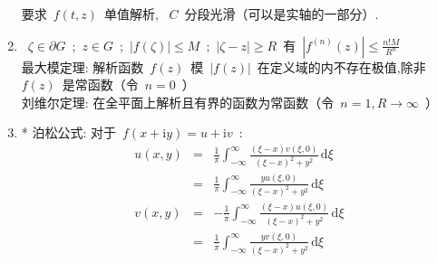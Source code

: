 \documentclass[11pt,a4paper]{article}
\newcommand\diff{\,\mathrm{d}}
\renewcommand{\m}[1]{~$\displaystyle#1$~}
\newcommand\mi{\mathrm{i}}
\begin{document}
\begin{enumerate}
        要求\m{f(t,z)}单值解析, \m{C}分段光滑（可以是实轴的一部分）.
      \item \m{\zeta\in\partial G};\m{z\in G};\m{|f(\zeta)|\leq M};\m{|\zeta - z|\geq R}有\m{\left|f^{(n)}(z)\right|\leq\frac{n!M}{R^n}}\\
        最大模定理: 解析函数\m{f(z)}模\m{|f(z)|}在定义域的内不存在极值,除非\m{f(z)}是常函数（令\m{n = 0}）\\
        刘维尔定理: 在全平面上解析且有界的函数为常函数（令\m{n = 1,R\to\infty}）
      \item* 泊松公式: 对于\m{f(x+\mi y) = u + \mi v}:
        \begin{eqnarray*}
          u(x,y) &=& \frac 1\pi \int_{-\infty}^{\infty}\frac {(\xi - x)v(\xi,0)}{(\xi - x)^2 + y^2}\diff\xi \\
                 &=& \frac 1\pi \int_{-\infty}^{\infty}\frac {yu(\xi,0)}{(\xi - x)^2 + y^2}\diff\xi \\
          v(x,y) &=& -\frac 1\pi \int_{-\infty}^{\infty}\frac {(\xi - x)u(\xi,0)}{(\xi - x)^2 + y^2}\diff\xi \\
                 &=& \frac 1\pi \int_{-\infty}^{\infty}\frac {yv(\xi,0)}{(\xi - x)^2 + y^2}\diff\xi
        \end{eqnarray*}
    \end{enumerate}
\end{document}
